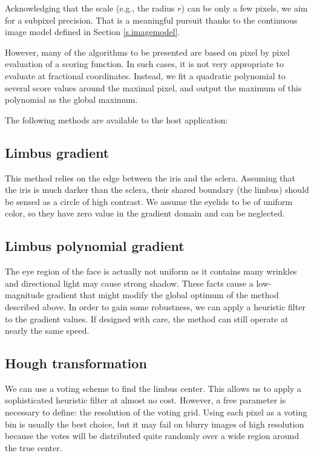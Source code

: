 Acknowledging that the scale (e.g., the radius $r$) can be only a few pixels, we aim for a subpixel precision.
That is a meaningful pursuit thanks to the continuous image model defined in Section \ref{s.imagemodel}.

However, many of the algorithms to be presented are based on pixel by pixel evaluation of a scoring function.
In such cases, it is not very appropriate to evaluate at fractional coordinates.
Instead, we fit a quadratic polynomial to several score values around the maximal pixel, and output the maximum of this polynomial as the global maximum.

The following methods are available to the host application:

\subsection{Limbus gradient}
This method relies on the edge between the iris and the sclera.
Assuming that the iris is much darker than the sclera, their shared boundary (the limbus) should be sensed as a circle of high contrast.
We assume the eyelids to be of uniform color, so they have zero value in the gradient domain and can be neglected.

\subsection{Limbus polynomial gradient}
The eye region of the face is actually not uniform as it contains many wrinkles and directional light may cause strong shadow.
These facts cause a low-magnitude gradient that might modify the global optimum of the method described above.
In order to gain some robustness, we can apply a heuristic filter to the gradient values.
If designed with care, the method can still operate at nearly the same speed.

\subsection{Hough transformation}
We can use a voting scheme to find the limbus center.
This allows us to apply a sophisticated heuristic filter at almost no cost.
However, a free parameter is necessary to define: the resolution of the voting grid.
Using each pixel as a voting bin is usually the best choice, but it may fail on blurry images of high resolution because the votes will be distributed quite randomly over a wide region around the true center.


